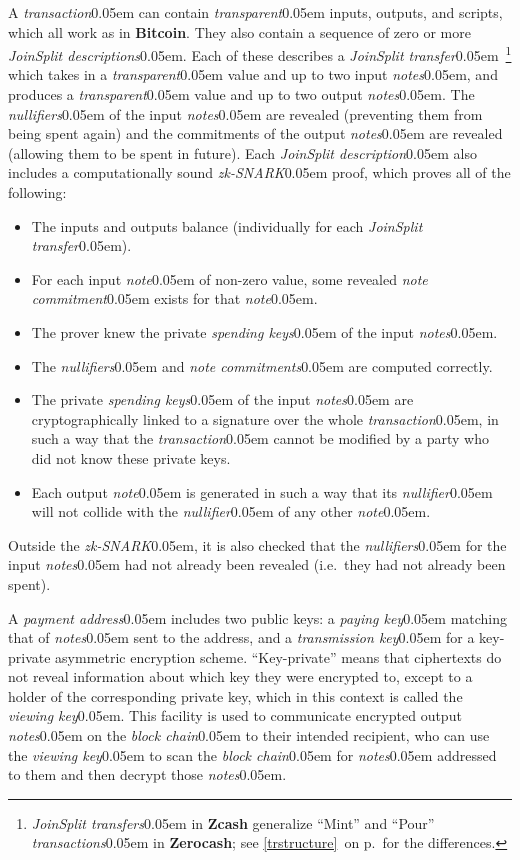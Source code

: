 \documentclass{article}
\renewcommand{\emph}[1]{\hspace{0.15em}{\fontfamily{pnc}\selectfont\scalebox{1.02}[0.999]{\textit{#1}}}\hspace{0.02em}}
\newcommand{\crossref}[1]{\autoref{#1}\, \emph{`\nameref*{#1}\kern -0.05em'} on p.\,\pageref*{#1}}
\newcommand{\hairspace}{~\!}
\newcommand{\term}[1]{\textsl{#1}\kern 0.05em\xspace}
\newcommand{\termbf}[1]{\textbf{#1}\xspace}
\newcommand{\Zcash}{\termbf{Zcash}}
\newcommand{\Zerocash}{\termbf{Zerocash}}
\newcommand{\Bitcoin}{\termbf{Bitcoin}}
\newcommand{\note}{\term{note}}
\newcommand{\notes}{\term{notes}}
\newcommand{\noteCommitment}{\term{note commitment}}
\newcommand{\noteCommitments}{\term{note commitments}}
\newcommand{\joinSplitDescription}{\term{JoinSplit description}}
\newcommand{\joinSplitDescriptions}{\term{JoinSplit descriptions}}
\newcommand{\joinSplitTransfer}{\term{JoinSplit transfer}}
\newcommand{\joinSplitTransfers}{\term{JoinSplit transfers}}
\newcommand{\transaction}{\term{transaction}}
\newcommand{\transactions}{\term{transactions}}
\newcommand{\transparent}{\term{transparent}}
\newcommand{\blockchain}{\term{block chain}}
\newcommand{\nullifier}{\term{nullifier}}
\newcommand{\nullifiers}{\term{nullifiers}}
\newcommand{\paymentAddress}{\term{payment address}}
\newcommand{\viewingKey}{\term{viewing key}}
\newcommand{\spendingKeys}{\term{spending keys}}
\newcommand{\payingKey}{\term{paying key}}
\newcommand{\transmissionKey}{\term{transmission key}}
\newcommand{\zkSNARK}{\term{zk-SNARK}}
\begin{document}
A \transaction can contain \transparent inputs, outputs, and scripts,
which all work as in \Bitcoin. They also contain a sequence of zero or
more \joinSplitDescriptions. Each of these describes a \joinSplitTransfer\hairspace\footnote{
\joinSplitTransfers in \Zcash generalize ``Mint'' and ``Pour'' \transactions
in \Zerocash; see \crossref{trstructure} for the differences.}
which takes in a \transparent value and up to two input \notes, and produces a
\transparent value and up to two output \notes. The \nullifiers of the input
\notes are revealed (preventing them from being spent again) and the
commitments of the output \notes are revealed (allowing them to be spent in
future). Each \joinSplitDescription also includes a computationally sound
\zkSNARK proof, which proves all of the following:

\begin{itemize}
  \item The inputs and outputs balance (individually for each \joinSplitTransfer).
  \item For each input \note of non-zero value, some revealed \noteCommitment
        exists for that \note.
  \item The prover knew the private \spendingKeys of the input \notes.
  \item The \nullifiers and \noteCommitments are computed correctly.
  \item The private \spendingKeys of the input \notes are cryptographically
        linked to a signature over the whole \transaction, in such a way that
        the \transaction cannot be modified by a party who did not know these
        private keys.
  \item Each output \note is generated in such a way that its \nullifier will
        not collide with the \nullifier of any other \note.
\end{itemize}

Outside the \zkSNARK, it is also checked that the \nullifiers for the input
\notes had not already been revealed (i.e.\ they had not already been spent).

A \paymentAddress includes two public keys: a \payingKey matching that of \notes
sent to the address, and a \transmissionKey for a key-private asymmetric encryption
scheme. ``Key-private'' means that ciphertexts do not reveal information about
which key they were encrypted to, except to a holder of the corresponding
private key, which in this context is called the \viewingKey. This facility is
used to communicate encrypted output \notes on the \blockchain to their
intended recipient, who can use the \viewingKey to scan the \blockchain for
\notes addressed to them and then decrypt those \notes.
\end{document}
